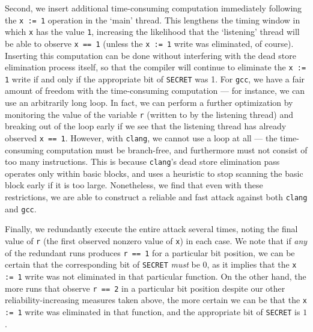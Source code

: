 Second, we insert additional time-consuming computation immediately following
the \verb|x := 1| operation in the `main' thread.
This lengthens the timing window in which \verb|x| has the value \verb|1|,
increasing the likelihood that the `listening' thread will be able to observe
\verb|x == 1| (unless the \verb|x := 1| write was eliminated, of course).
Inserting this computation can be done without interfering with the dead store
elimination process itself, so that the compiler will continue to eliminate
the \verb|x := 1| write if and only if the appropriate bit of \verb|SECRET|
was 1.
For \verb|gcc|, we have a fair amount of freedom with the time-consuming
computation --- for instance, we can use an arbitrarily long loop.
In fact, we can perform a further optimization by monitoring the value of the
variable \verb|r| (written to by the listening thread) and breaking out of the
loop early if we see that the listening thread has already observed
\verb|x == 1|.
However, with \verb|clang|, we cannot use a loop at all --- the time-consuming
computation must be branch-free, and furthermore must not consist of too many
instructions.
This is because \verb|clang|'s dead store elimination pass operates only
within basic blocks, and uses a heuristic to stop scanning the basic block
early if it is too large.
Nonetheless, we find that even with these restrictions, we are able to
construct a reliable and fast attack against both \verb|clang| and \verb|gcc|.

Finally, we redundantly execute the entire attack several times, noting the
final value of \verb|r| (the first observed nonzero value of \verb|x|) in each
case.
We note that if \emph{any} of the redundant runs produces \verb|r == 1| for a
particular bit position, we can be certain that the corresponding bit of
\verb|SECRET| \emph{must} be $0$, as it implies that the \verb|x := 1| write
was not eliminated in that particular function.
On the other hand, the more runs that observe \verb|r == 2| in a particular bit
position despite our other reliability-increasing measures taken above, the
more certain we can be that the \verb|x := 1| write was eliminated in that
function, and the appropriate bit of \verb|SECRET| is $1$.


